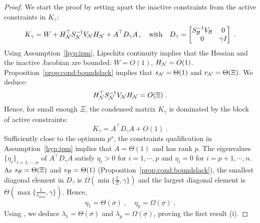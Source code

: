 \begin{proof}
  We start the proof by setting apart the inactive constraints from the active constraints in $K_\gamma$:
  \begin{equation}
    K_\gamma = W + H_{\mathcal{N}}^\top S_{\mathcal{N}}^{-1} V_{\mathcal{N}} H_{\mathcal{N}}
    + A^\top D_\gamma A \, ,
    \quad
    \text{with} \quad D_\gamma = \begin{bmatrix} S_{\mathcal{B}}^{-1} V_{\mathcal{B}} & 0 \\ 0 & \gamma I \end{bmatrix} \; .
  \end{equation}
  Using Assumption~\ref{hyp:ipm}, Lipschitz
  continuity implies that the Hessian and the inactive Jacobian
  are bounded: $W = O(1)$, $H_{\mathcal{N}} = O(1)$.
  Proposition~\ref{prop:cond:boundslack} implies that
  $s_{\mathcal{N}} = \Theta(1)$ and $v_{\mathcal{N}} = \Theta(\Xi)$. We deduce:
  \begin{equation}
    \label{eq:cond:inactiveblock}
    H_{\mathcal{N}}^\top S_{\mathcal{N}}^{-1} V_{\mathcal{N}} H_{\mathcal{N}} = O(\Xi) \; .
  \end{equation}
  Hence, for small enough $\Xi$,
  the condensed matrix $K_\gamma$ is dominated by the block of active constraints:
  \begin{equation}
    K_\gamma = A^\top D_\gamma A + O(1) \; .
  \end{equation}
  Sufficiently close to the optimum $p^\star$, the constraints qualification
  in Assumption~\ref{hyp:ipm} implies that $A = \Theta(1)$ and has rank $p$.
  The eigenvalues $\{\eta_i\}_{i =1,\cdots,n}$ of $A^\top D_\gamma A$
  satisfy $\eta_i > 0$ for $i = 1,\cdots,p$ and $\eta_i = 0$ for $i = p+1, \cdots, n$.
  As $s_{\mathcal{B}} = \Theta(\Xi)$ and $v_{\mathcal{B}} = \Theta(1)$
  (Proposition~\ref{prop:cond:boundslack}), the smallest diagonal
  element in $D_\gamma$ is $\Omega(\min\{\frac{1}{\Xi}, \gamma\})$
  and the largest diagonal element is $\Theta(\max\{\frac{1}{s_{min}}, \gamma\})$.
  Hence,
  \begin{equation}
    \eta_1 = \Theta(\overline{\sigma}) \; , \quad
    \eta_p = \Omega(\underline{\sigma}) \; .
  \end{equation}
  Using \cite[Lemma 3.1]{wright1998ill}, we deduce $\lambda_1 = \Theta(\overline{\sigma})$
  and $\lambda_p = \Omega(\underline{\sigma})$, proving the first result (i).


\end{proof}
